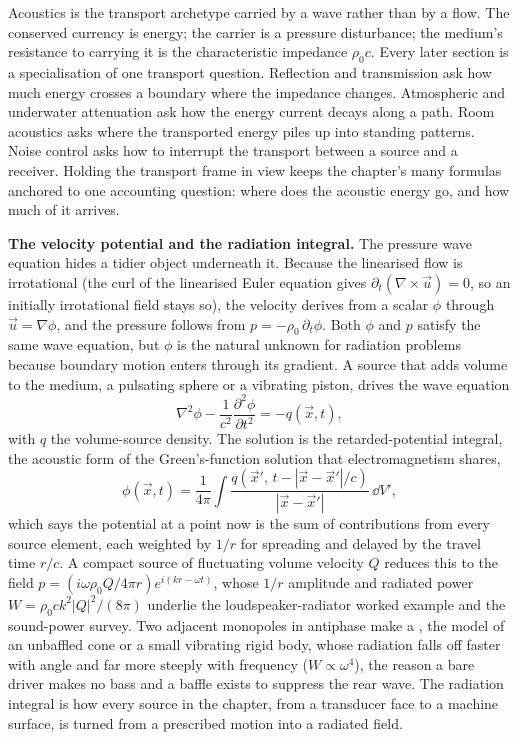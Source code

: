 \begin{archetype}[Transport]
Acoustics is the transport archetype carried by a wave rather than by a
flow. The conserved currency is energy; the carrier is a pressure
disturbance; the medium's resistance to carrying it is the
characteristic impedance $\rho_0 c$. Every later section is a
specialisation of one transport question. Reflection and transmission
ask how much energy crosses a boundary where the impedance changes.
Atmospheric and underwater attenuation ask how the energy current
decays along a path. Room acoustics asks where the transported energy
piles up into standing patterns. Noise control asks how to interrupt
the transport between a source and a receiver. Holding the transport
frame in view keeps the chapter's many formulas anchored to one
accounting question: where does the acoustic energy go, and how much
of it arrives.
\end{archetype}

\begin{mastery}
\textbf{The velocity potential and the radiation integral.} The pressure
wave equation hides a tidier object underneath it. Because the linearised
flow is irrotational (the curl of the linearised Euler equation gives
$\partial_t(\nabla\times\vec u) = 0$, so an initially irrotational field
stays so), the velocity derives from a scalar 
$\phi$ through $\vec u = \nabla\phi$, and the pressure follows from
$p = -\rho_0\,\partial_t\phi$. Both $\phi$ and $p$ satisfy the same wave
equation, but $\phi$ is the natural unknown for radiation problems because
boundary motion enters through its gradient. A source that adds volume to
the medium, a pulsating sphere or a vibrating piston, drives the
 wave equation
\[
\nabla^2 \phi - \frac{1}{c^2}\frac{\partial^2\phi}{\partial t^2}
= -q(\vec x, t),
\]
with $q$ the volume-source density. The solution is the retarded-potential
integral, the acoustic form of the Green's-function solution that
electromagnetism shares,
\[
\phi(\vec x, t) = \frac{1}{4\pi}\int
\frac{q\!\left(\vec x', \, t - |\vec x - \vec x'|/c\right)}
     {|\vec x - \vec x'|}\,\dd V',
\]
which says the potential at a point now is the sum of contributions from
every source element, each weighted by $1/r$ for spreading and delayed by
the travel time $r/c$. A compact source of fluctuating volume velocity $Q$
reduces this to the  field $p = (i\omega\rho_0 Q/4\pi r)
e^{i(kr-\omega t)}$, whose $1/r$ amplitude and radiated power $W =
\rho_0 c k^2 |Q|^2/(8\pi)$ underlie the loudspeaker-radiator worked example
and the sound-power survey. Two adjacent monopoles in antiphase make a
, the model of an unbaffled cone or a small vibrating
rigid body, whose radiation falls off faster with angle and far more
steeply with frequency ($W\propto\omega^4$), the reason a bare driver
makes no bass and a baffle exists to suppress the rear wave. The radiation
integral is how every source in the chapter, from a transducer face to a
machine surface, is turned from a prescribed motion into a radiated field.
\end{mastery}


